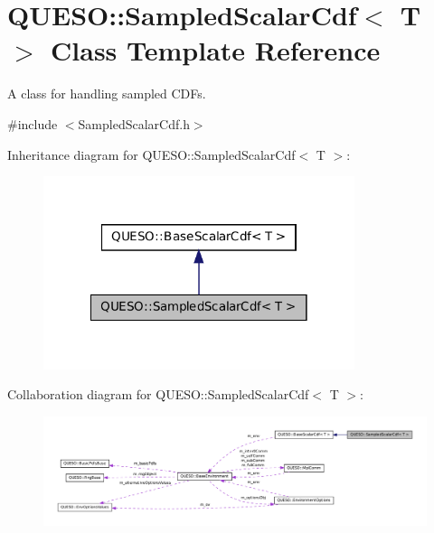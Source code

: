 \hypertarget{class_q_u_e_s_o_1_1_sampled_scalar_cdf}{\section{Q\-U\-E\-S\-O\-:\-:Sampled\-Scalar\-Cdf$<$ T $>$ Class Template Reference}
\label{class_q_u_e_s_o_1_1_sampled_scalar_cdf}
}


A class for handling sampled C\-D\-Fs.  




{\ttfamily \#include $<$Sampled\-Scalar\-Cdf.\-h$>$}



Inheritance diagram for Q\-U\-E\-S\-O\-:\-:Sampled\-Scalar\-Cdf$<$ T $>$\-:
\nopagebreak
\begin{figure}[H]
\begin{center}
\leavevmode
\includegraphics[width=258pt]{class_q_u_e_s_o_1_1_sampled_scalar_cdf__inherit__graph}
\end{center}
\end{figure}


Collaboration diagram for Q\-U\-E\-S\-O\-:\-:Sampled\-Scalar\-Cdf$<$ T $>$\-:
\nopagebreak
\begin{figure}[H]
\begin{center}
\leavevmode
\includegraphics[width=350pt]{class_q_u_e_s_o_1_1_sampled_scalar_cdf__coll__graph}
\end{center}
\end{figure}
